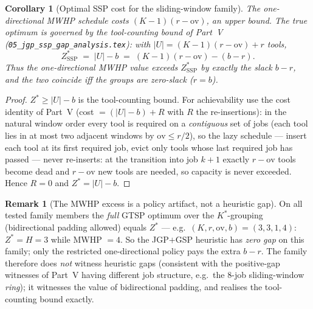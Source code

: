 \documentclass[11pt,a4paper]{article}
\theoremstyle{plain}
\newtheorem{corollary}[theorem]{Corollary}
\theoremstyle{definition}
\newtheorem{remark}[theorem]{Remark}
\newcommand{\Kstar}{K^*}
\begin{document}
\begin{corollary}[Optimal SSP cost for the sliding-window family]
\label{cor:sliding}
The one-directional MWHP schedule costs $(K-1)(r-\mathrm{ov})$, an \emph{upper} bound.
The true optimum is governed by the tool-counting bound of Part~V
(\texttt{05\_jgp\_ssp\_gap\_analysis.tex}): with $|U| = (K-1)(r-\mathrm{ov})+r$ tools,
\[
  Z_\mathrm{SSP}^{*} \;=\; |U|-b \;=\; (K-1)(r-\mathrm{ov}) - (b-r).
\]
Thus the one-directional MWHP value exceeds $Z_\mathrm{SSP}^{*}$ by exactly the slack
$b-r$, and the two coincide iff the groups are \emph{zero-slack} ($r=b$).
\end{corollary}
\begin{proofbox}
\begin{proof}
$Z^{*}\ge|U|-b$ is the tool-counting bound. For achievability use the cost
identity of Part~V (cost $=(|U|-b)+R$ with $R$ the re-insertions): in the natural
window order every tool is required on a \emph{contiguous} set of jobs (each tool
lies in at most two adjacent windows by $\mathrm{ov}\le r/2$), so the lazy
schedule --- insert each tool at its first required job, evict only tools whose
last required job has passed --- never re-inserts: at the transition into job
$k{+}1$ exactly $r-\mathrm{ov}$ tools become dead and $r-\mathrm{ov}$ new tools
are needed, so capacity is never exceeded. Hence $R=0$ and
$Z^{*}=|U|-b$.
\end{proof}
\end{proofbox}

\begin{remark}[The MWHP excess is a policy artifact, not a heuristic gap]
On all tested family members the \emph{full} GTSP optimum over the
$\Kstar$-grouping (bidirectional padding allowed) equals $Z^{*}$ --- e.g.\
$(K,r,\mathrm{ov},b)=(3,3,1,4)$: $Z^{*}=H=3$ while MWHP $=4$. So the
JGP$+$GSP heuristic has \emph{zero gap} on this family; only the restricted
one-directional policy pays the extra $b-r$. The family therefore does
\emph{not} witness heuristic gaps (consistent with the positive-gap witnesses of
Part~V having different job structure, e.g.\ the $8$-job sliding-window
\emph{ring}); it witnesses the value of bidirectional padding, and realises the
tool-counting bound exactly.
\end{remark}
\end{document}
